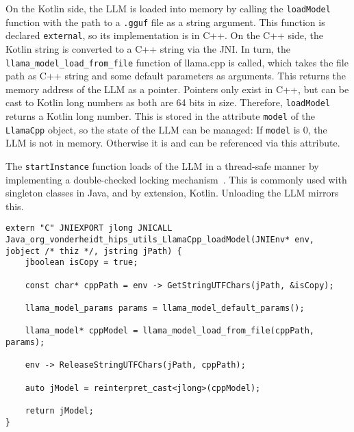 On the Kotlin side, the \gls{LLM} is loaded into memory by calling the \lstinline|loadModel| function with the path to a \lstinline|.gguf| file as a string argument. This function is declared \lstinline|external|, so its implementation is in C++. On the C++ side, the Kotlin string is converted to a C++ string via the \gls{JNI}. In turn, the \lstinline|llama_model_load_from_file| function of llama.cpp is called, which takes the file path as C++ string and some default parameters as arguments. This returns the memory address of the \gls{LLM} as a pointer. Pointers only exist in C++, but can be cast to Kotlin long numbers as both are 64 bits in size. Therefore, \lstinline|loadModel| returns a Kotlin long number. This is stored in the attribute \lstinline|model| of the \lstinline|LlamaCpp| object, so the state of the \gls{LLM} can be managed: If \lstinline|model| is 0, the \gls{LLM} is not in memory. Otherwise it is and can be referenced via this attribute.

The \lstinline|startInstance| function loads of the \gls{LLM} in a thread-safe manner by implementing a double-checked locking mechanism~\cite{ishizakiTransformingJavaPrograms2014}. This is commonly used with singleton classes in Java, and by extension, Kotlin. Unloading the \gls{LLM} mirrors this.

\vspace{0.25cm}

\begin{lstlisting}[caption={[JNI: C++ side]{Example for the C++ side of the \gls{JNI}: Implementation of the function declared \lstinline|external| in Listing~\ref{lst:jniKotlin}.}}, label={lst:jniCpp}]
extern "C" JNIEXPORT jlong JNICALL Java_org_vonderheidt_hips_utils_LlamaCpp_loadModel(JNIEnv* env, jobject /* thiz */, jstring jPath) {
    jboolean isCopy = true;

    const char* cppPath = env -> GetStringUTFChars(jPath, &isCopy);

    llama_model_params params = llama_model_default_params();

    llama_model* cppModel = llama_model_load_from_file(cppPath, params);

    env -> ReleaseStringUTFChars(jPath, cppPath);

    auto jModel = reinterpret_cast<jlong>(cppModel);

    return jModel;
}
\end{lstlisting}

